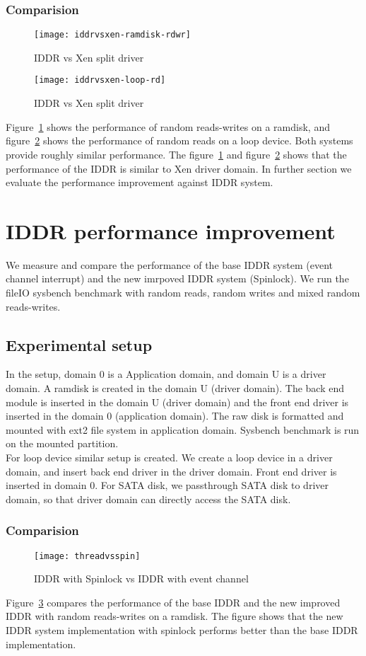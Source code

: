 \subsubsection*{Comparision}
\begin{figure}[!ht]
\centering
\texttt{[image: iddrvsxen-ramdisk-rdwr]}
\caption{IDDR vs Xen split driver}
\label{fig:iddrvsxen-ramdisk-rdwr}
\end{figure}
\begin{figure}[!ht]
\centering
\texttt{[image: iddrvsxen-loop-rd]}
\caption{IDDR vs Xen split driver}
\label{fig:iddrvsxen-loop-rd}
\end{figure}
Figure~\ref{fig:iddrvsxen-ramdisk-rdwr} shows the performance of random reads-writes on a ramdisk, and figure~\ref{fig:iddrvsxen-loop-rd} shows the performance of random reads on a loop device. Both systems provide roughly similar performance. The figure~\ref{fig:iddrvsxen-ramdisk-rdwr} and figure~\ref{fig:iddrvsxen-loop-rd} shows that the performance of the IDDR is similar to Xen driver domain. In further section we evaluate the performance improvement against IDDR system.

\section{IDDR performance improvement}
We measure and compare the performance of the base IDDR system (event channel interrupt) and the new imrpoved IDDR system (Spinlock). We run the fileIO sysbench benchmark with random reads, random writes and mixed random reads-writes. 
\subsection{Experimental setup}
In the setup, domain 0 is a Application domain, and domain U is a driver domain. A ramdisk is created in the domain U (driver domain). The back end module is inserted in the domain U (driver domain) and the front end driver is inserted in the domain 0 (application domain). The raw disk is formatted and mounted with ext2 file system in application domain. Sysbench benchmark is run on the mounted partition. 
\\[3mm]
For loop device similar setup is created. We create a loop device in a driver domain, and insert back end driver in the driver domain. Front end driver is inserted in domain 0. For SATA disk, we passthrough SATA disk to driver domain, so that driver domain can directly access the SATA disk. 
\subsubsection*{Comparision}
\begin{figure}[!ht]
\centering
\texttt{[image: threadvsspin]}
\caption{IDDR with Spinlock vs IDDR with event channel}
\label{fig:threadvsspin}
\end{figure}
Figure~\ref{fig:threadvsspin} compares the performance of the base IDDR and the new improved IDDR with random reads-writes on a ramdisk. The figure shows that the new IDDR system implementation with spinlock performs better than the base IDDR implementation. 
\pagebreak

